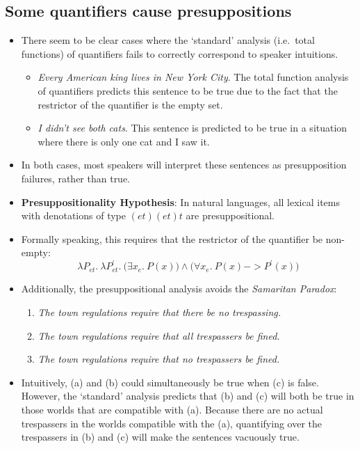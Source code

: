 \documentclass[a4paper]{article}
\begin{document}
\subsection{Some quantifiers cause presuppositions}
\begin{itemize}
\item There seem to be clear cases where the `standard' analysis (i.e.\ total functions) of quantifiers fails to correctly correspond to speaker intuitions.
\begin{itemize}
\item \emph{Every American king lives in New York City}. The total function analysis of quantifiers predicts this sentence to be true due to the fact that the restrictor of the quantifier is the empty set.
\item \emph{I didn't see both cats}. This sentence is predicted to be true in a situation where there is only one cat and I saw it.
\end{itemize}
\item In both cases, most speakers will interpret these sentences as presupposition failures, rather than true.
\item \textbf{Presuppositionality Hypothesis}: In natural languages, all lexical items with denotations of type $(et)(et)t$ are presuppositional.
\item Formally speaking, this requires that the restrictor of the quantifier be non-empty:
  $$\lambda P_{et}.\ \lambda P^\prime_{et}.\ \Big(\exists x_e.\ P(x)\Big) \land \Big(\forall x_e.\ P(x) -> P^\prime(x)\Big)$$
\item Additionally, the presuppositional analysis avoids the \emph{Samaritan Paradox}:
  \begin{enumerate}
  \item \emph{The town regulations require that there be no trespassing.}
  \item \emph{The town regulations require that all trespassers be fined.}
  \item \emph{The town regulations require that no trespassers be fined.}
  \end{enumerate}
\item Intuitively, (a) and (b) could simultaneously be true when (c) is false. However, the `standard' analysis predicts that (b) and (c) will both be true in those worlds that are compatible with (a). Because there are no actual trespassers in the worlds compatible with the (a), quantifying over the trespassers in (b) and (c) will make the sentences vacuously true.
\end{itemize}
\end{document}
